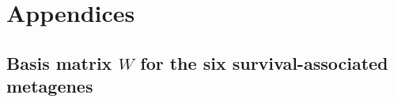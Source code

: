 \documentclass[dissertation.tex]{subfiles}
\begin{document}
\appendix
\section{Appendices}
\subsection{Basis matrix $W$ for the six survival-associated metagenes}
\label{app:sig-w-matrix}

\end{document}
